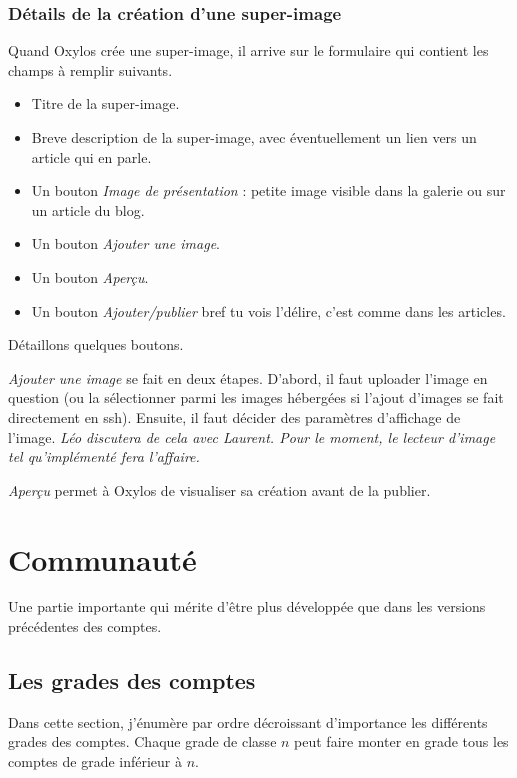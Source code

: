 \documentclass[french]{report}
\theoremstyle{plain}
\begin{document}
		\subsection{Détails de la création d'une super-image}

			Quand Oxylos crée une super-image, il arrive sur le formulaire qui contient les champs à remplir suivants.
			\begin{itemize}
				\item Titre de la super-image.
				\item Breve description de la super-image, avec éventuellement un lien vers un article qui en parle.
				\item Un bouton \emph{Image de présentation} : petite image visible dans la galerie ou sur un article du blog.
				\item Un bouton \emph{Ajouter une image}.
				\item Un bouton \emph{Aperçu}.
				\item Un bouton \emph{Ajouter/publier} bref tu vois l'délire, c'est comme dans les articles.
			\end{itemize}
			\phantom{troud}

			Détaillons quelques boutons. 

			\emph{Ajouter une image} se fait en deux étapes. D'abord, il faut uploader l'image en question (ou la sélectionner parmi les images hébergées si l'ajout d'images se fait directement en ssh). Ensuite, il faut décider des paramètres d'affichage de l'image. \emph{Léo discutera de cela avec Laurent. Pour le moment, le lecteur d'image tel qu'implémenté fera l'affaire.}

			\emph{Aperçu} permet à Oxylos de visualiser sa création avant de la publier.






\chapter{Communauté} \label{communaute}
	Une partie importante qui mérite d'être plus développée que dans les versions précédentes des comptes. 
	\section{Les grades des comptes}
		Dans cette section, j'énumère par ordre décroissant d'importance les différents grades des comptes. Chaque grade de classe $n$ peut faire monter en grade tous les comptes de grade inférieur à $n$.
\end{document}
